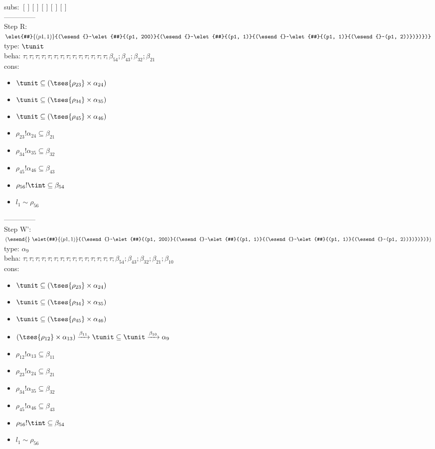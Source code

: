 \documentclass[12pt]{article}
\begin{document}
 subs:  $ [ ] [] [] [] [] $ 
  \\--------------\\ 
Step R: $ \elet{#}{(p1, 1)}{(\esend{}~\elet{#}{(p1, 200)}{(\esend{}~\elet{#}{(p1, 1)}{(\esend{}~\elet{#}{(p1, 1)}{(\esend{}~(p1, 2))})})})} $\\
  type: $ \tunit $ 
\\  beha: $ \tau; \tau; \tau; \tau; \tau; \tau; \tau; \tau; \tau; \tau; \tau; \tau; \tau; \tau; \beta_{54}; \beta_{43}; \beta_{32}; \beta_{21} $ 
\\  cons: \begin{itemize}
\item $ \tunit \subseteq ( \tses{ \rho_{23}} \times \alpha_{24}) $
\item $ \tunit \subseteq ( \tses{ \rho_{34}} \times \alpha_{35}) $
\item $ \tunit \subseteq ( \tses{ \rho_{45}} \times \alpha_{46}) $
\item $ \rho_{23}!\alpha_{24} \subseteq \beta_{21} $
\item $ \rho_{34}!\alpha_{35} \subseteq \beta_{32} $
\item $ \rho_{45}!\alpha_{46} \subseteq \beta_{43} $
\item $ \rho_{56}!\tint \subseteq \beta_{54} $
\item $ l_{1} \sim\rho_{56} $
\end{itemize} 
  --------------\\ 
Step W': $ (\esend{}~\elet{#}{(p1, 1)}{(\esend{}~\elet{#}{(p1, 200)}{(\esend{}~\elet{#}{(p1, 1)}{(\esend{}~\elet{#}{(p1, 1)}{(\esend{}~(p1, 2))})})})}) $\\
  type: $ \alpha_{9} $ 
\\  beha: $ \tau; \tau; \tau; \tau; \tau; \tau; \tau; \tau; \tau; \tau; \tau; \tau; \tau; \tau; \tau; \beta_{54}; \beta_{43}; \beta_{32}; \beta_{21}; \beta_{10} $ 
\\  cons: \begin{itemize}
\item $ \tunit \subseteq ( \tses{ \rho_{23}} \times \alpha_{24}) $
\item $ \tunit \subseteq ( \tses{ \rho_{34}} \times \alpha_{35}) $
\item $ \tunit \subseteq ( \tses{ \rho_{45}} \times \alpha_{46}) $
\item $ ( \tses{ \rho_{12}} \times \alpha_{13}) \xrightarrow{\beta_{11}} \tunit \subseteq \tunit \xrightarrow{\beta_{10}} \alpha_{9} $
\item $ \rho_{12}!\alpha_{13} \subseteq \beta_{11} $
\item $ \rho_{23}!\alpha_{24} \subseteq \beta_{21} $
\item $ \rho_{34}!\alpha_{35} \subseteq \beta_{32} $
\item $ \rho_{45}!\alpha_{46} \subseteq \beta_{43} $
\item $ \rho_{56}!\tint \subseteq \beta_{54} $
\item $ l_{1} \sim\rho_{56} $
\end{itemize} 
\end{document}
